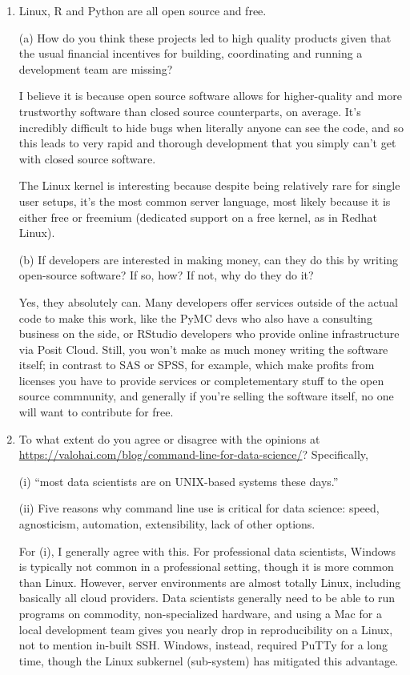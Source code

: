 \documentclass[12pt]{article}
\begin{document}
\begin{enumerate}

\item Linux, R and Python are all open source and free. 

(a) How do you think these projects led to high quality products given that the usual financial incentives for building, coordinating and running a development team are missing?

I believe it is because open source software allows for higher-quality and more trustworthy software than closed source counterparts, on average. It's incredibly difficult to hide bugs when literally anyone can see the code, and so this leads to very rapid and thorough development that you simply can't get with closed source software.

The Linux kernel is interesting because despite being relatively rare for single user setups, it's the most common server language, most likely because it is either free or freemium (dedicated support on a free kernel, as in Redhat Linux).

(b) If developers are interested in making money, can they do this by writing open-source software? If so, how? If not, why do they do it?

Yes, they absolutely can. Many developers offer services outside of the actual code to make this work, like the PyMC devs who also have a consulting business on the side, or RStudio developers who provide online infrastructure via Posit Cloud. Still, you won't make as much money writing the software itself; in contrast to SAS or SPSS, for example, which make profits from licenses you have to provide services or completementary stuff to the open source commnunity, and generally if you're selling the software itself, no one will want to contribute for free.

\item To what extent do you agree or disagree with the opinions at
\url{https://valohai.com/blog/command-line-for-data-science/}?
Specifically,

(i) ``most data scientists are on UNIX-based systems these days.''

(ii) Five reasons why command line use is critical for data science: speed, agnosticism, automation, extensibility, lack of other options.

For (i), I generally agree with this. For professional data scientists, Windows is typically not common in a professional setting, though it is more common than Linux. However, server environments are almost totally Linux, including basically all cloud providers. Data scientists generally need to be able to run programs on commodity, non-specialized hardware, and using a Mac for a local development team gives you nearly drop in reproducibility on a Linux, not to mention in-built SSH. Windows, instead, required PuTTy for a long time, though the Linux subkernel (sub-system) has mitigated this advantage.


\end{enumerate}
\end{document}
